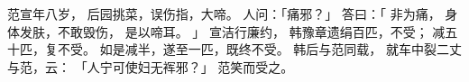 
\switchcolumn*[\section{}]

范宣年八岁，
后园挑菜，误伤指，大啼。
人问：「痛邪？」
答曰：「
    非为痛，
    身体发肤，不敢毁伤，
    是以啼耳。
」
宣洁行廉约，
韩豫章遗绢百匹，不受；
减五十匹，复不受。
如是减半，遂至一匹，既终不受。
韩后与范同载，
就车中裂二丈与范，云：
「人宁可使妇无裈邪？」
范笑而受之。

\switchcolumn



